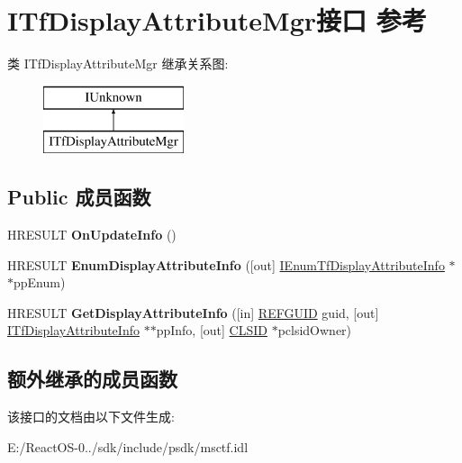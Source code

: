\hypertarget{interface_i_tf_display_attribute_mgr}{}\section{I\+Tf\+Display\+Attribute\+Mgr接口 参考}
\label{interface_i_tf_display_attribute_mgr}
类 I\+Tf\+Display\+Attribute\+Mgr 继承关系图\+:\begin{figure}[H]
\begin{center}
\leavevmode
\includegraphics[height=2.000000cm]{interface_i_tf_display_attribute_mgr}
\end{center}
\end{figure}
\subsection*{Public 成员函数}
\begin{DoxyCompactItemize}
\item 
\mbox{\label{interface_i_tf_display_attribute_mgr_acaf145548d91765e91880df0055b0cc6}} 
H\+R\+E\+S\+U\+LT {\bfseries On\+Update\+Info} ()
\item 
\mbox{\label{interface_i_tf_display_attribute_mgr_ad82c13335449c09f86ea6ce730436e22}} 
H\+R\+E\+S\+U\+LT {\bfseries Enum\+Display\+Attribute\+Info} (\mbox{[}out\mbox{]} \hyperlink{interface_i_enum_tf_display_attribute_info}{I\+Enum\+Tf\+Display\+Attribute\+Info} $\ast$$\ast$pp\+Enum)
\item 
\mbox{\label{interface_i_tf_display_attribute_mgr_a0bd6ee62c83c24f7effef1e0a11765ab}} 
H\+R\+E\+S\+U\+LT {\bfseries Get\+Display\+Attribute\+Info} (\mbox{[}in\mbox{]} \hyperlink{struct___g_u_i_d}{R\+E\+F\+G\+U\+ID} guid, \mbox{[}out\mbox{]} \hyperlink{interface_i_tf_display_attribute_info}{I\+Tf\+Display\+Attribute\+Info} $\ast$$\ast$pp\+Info, \mbox{[}out\mbox{]} \hyperlink{struct___i_i_d}{C\+L\+S\+ID} $\ast$pclsid\+Owner)
\end{DoxyCompactItemize}
\subsection*{额外继承的成员函数}


该接口的文档由以下文件生成\+:\begin{DoxyCompactItemize}
\item 
E\+:/\+React\+O\+S-\/0../sdk/include/psdk/msctf.\+idl\end{DoxyCompactItemize}
